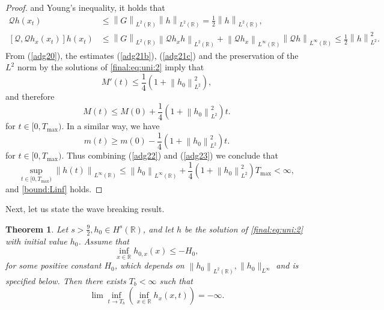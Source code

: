 \documentclass[final,11pt,a4paper,reqno]{amsart}
\newcommand{\norm}[1]{\left\| #1 \right\|}
\newcommand{\RR}{\mathbb R}
\newtheorem{theorem}{Theorem}
\theoremstyle{definition}
\begin{document}
\begin{proof}
and Young's  inequality, it holds that
\begin{align}
\mathscr{Q}h(x_{t}) &\leq \norm{G}_{L^{2}(\RR)}\norm{h}_{L^{2}(\RR)}= \frac{1}{2} \norm{h}_{L^{2}(\RR)},\label{adg21b}\\
[\mathscr{Q},\mathscr{Q}h_{x}(x_{t})]h(x_{t}) &\leq \norm{G}_{L^{2}(\RR)}\norm{ \mathscr{Q}h_{x} h}_{L^{2}(\RR)}+\norm{\mathscr{Q}h_{x}}_{L^{\infty}(\RR)} \norm{\mathscr{Q}h}_{L^{\infty}(\RR)} \leq \frac{1}{2} \norm{h}_{L^{2}}^{2}.\label{adg21c}
\end{align}
From (\ref{adg20}), the estimates (\ref{adg21b}), (\ref{adg21c}) and the preservation of the $L^{2}$ norm by the solutions of \eqref{final:eq:uni:2} imply that
\begin{equation*}
M'(t) \leq \frac{1}{4} \left( 1+\norm{h_{0}}_{L^{2}}^{2}\right),
\end{equation*}
and therefore
\begin{equation}\label{adg22}
M(t) \leq M(0)+\frac{1}{4} \left( 1+\norm{h_{0}}_{L^{2}}^{2}\right)t.
\end{equation}
for $t\in [0,T_{\max})$.
In a similar way, we have 
\begin{equation}\label{adg23}
m(t) \geq m(0)- \frac{1}{4} \left( 1+\norm{h_{0}}_{L^{2}}^{2}\right)t.
\end{equation}
for $t\in [0,T_{\max})$. Thus combining (\ref{adg22}) and (\ref{adg23}) we conclude that
\begin{equation}\label{L:infty:est:fin}
\displaystyle\sup_{t\in[0,T_{\max})} \norm{h(t)}_{L^{\infty}(\RR)} \leq \norm{h_0}_{L^{\infty}(\RR)}+\frac{1}{4}\left( 1+\norm{h_{0}}_{L^{2}}^{2}\right)T_{\max}<\infty,
\end{equation}
and \eqref{bound:Linf} holds.
\end{proof}
Next, let us state the wave breaking result. 
\begin{theorem}\label{theorem3}
Let $ s> {\frac{9}{2}}, h_0\in H^{s}(\mathbb{R})$, and let $h$ be the solution of \eqref{final:eq:uni:2} with initial value $h_0$. Assume that 
\begin{equation}\label{cond:ini}
\inf_{x\in\RR}h_{0,x}(x)\leq -H_{0},
\end{equation}
for some positive constant $H_{0}$, which depends on $\norm{h_0}_{L^{2}(\RR)},\|h_0\|_{L^\infty}$ and is specified below. Then there exists $T_{b}<\infty$ such that
\begin{equation}\label{waveb}
\displaystyle\lim \inf_{t\to T_{b}}\left(\inf_{x\in\RR} h_{x}(x,t)\right)=-\infty.
\end{equation} 
\end{theorem}
\end{document}
